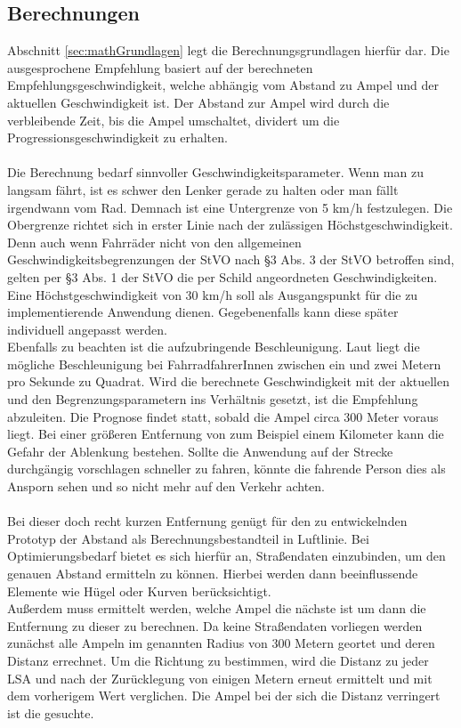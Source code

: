 \subsection{Berechnungen}
Abschnitt \ref{sec:mathGrundlagen} legt die Berechnungsgrundlagen hierfür dar. Die ausgesprochene Empfehlung basiert auf der berechneten Empfehlungsgeschwindigkeit, welche abhängig vom Abstand zu Ampel und der aktuellen Geschwindigkeit ist. Der Abstand zur Ampel wird durch die verbleibende Zeit, bis die Ampel umschaltet, dividert um die Progressionsgeschwindigkeit zu erhalten.\\\\
Die Berechnung bedarf sinnvoller Geschwindigkeitsparameter. Wenn man zu langsam fährt, ist es schwer den Lenker gerade zu halten oder man fällt irgendwann vom Rad. Demnach ist eine Untergrenze von 5 km/h festzulegen. Die Obergrenze richtet sich in erster Linie nach der zulässigen Höchstgeschwindigkeit. Denn auch wenn Fahrräder nicht von den allgemeinen Geschwindigkeitsbegrenzungen der StVO nach \S 3 Abs. 3 der StVO betroffen sind, gelten per \S 3 Abs. 1 der StVO die per Schild angeordneten Geschwindigkeiten. Eine Höchstgeschwindigkeit von 30 km/h soll als Ausgangspunkt für die zu implementierende Anwendung dienen. Gegebenenfalls kann diese später individuell angepasst werden. \\
Ebenfalls zu beachten ist die aufzubringende Beschleunigung. Laut \cite{beschleunigung} liegt die mögliche Beschleunigung bei FahrradfahrerInnen zwischen ein und zwei Metern pro Sekunde zu Quadrat. Wird die berechnete Geschwindigkeit mit der aktuellen und den Begrenzungsparametern ins Verhältnis gesetzt, ist die Empfehlung abzuleiten. Die Prognose findet statt, sobald die Ampel circa 300 Meter voraus liegt. Bei einer größeren Entfernung von zum Beispiel einem Kilometer kann die Gefahr der Ablenkung bestehen. Sollte die Anwendung auf der Strecke durchgängig vorschlagen schneller zu fahren, könnte die fahrende Person dies als Ansporn sehen und so nicht mehr auf den Verkehr achten.\\\\ 
Bei dieser doch recht kurzen Entfernung genügt für den zu entwickelnden Prototyp der Abstand als Berechnungsbestandteil in Luftlinie. Bei Optimierungsbedarf bietet es sich hierfür an, Straßendaten einzubinden, um den genauen Abstand ermitteln zu können. Hierbei werden dann beeinflussende Elemente wie Hügel oder Kurven berücksichtigt.\\
Außerdem muss ermittelt werden, welche Ampel die nächste ist um dann die Entfernung zu dieser zu berechnen. Da keine Straßendaten vorliegen werden zunächst alle Ampeln im genannten Radius von 300 Metern geortet und deren Distanz errechnet. Um die Richtung zu bestimmen, wird die Distanz zu jeder \gls{LSA} und nach der Zurücklegung von einigen Metern erneut ermittelt und mit dem vorherigem Wert verglichen. Die Ampel bei der sich die Distanz verringert ist die gesuchte.
